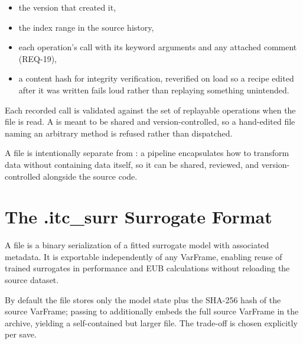 \begin{itemize}[noitemsep,topsep=2pt]
  \item the \itc{} version that created it,
  \item the index range in the source history,
  \item each operation's call with its keyword arguments and any
    attached comment (REQ-19),
  \item a content hash for integrity verification, reverified on load so
    a recipe edited after it was written fails loud rather than
    replaying something unintended.
\end{itemize}

Each recorded call is validated against the set of replayable operations
when the file is read. A  is meant to be shared and
version-controlled, so a hand-edited file naming an arbitrary method is
refused rather than dispatched.

A  file is intentionally separate from : a
pipeline encapsulates how to transform data without containing data itself,
so it can be shared, reviewed, and version-controlled alongside the source
code.

\section{The .itc\_surr Surrogate Format}

A  file is a binary serialization of a fitted surrogate
model with associated metadata. It is exportable independently of any
VarFrame, enabling reuse of trained surrogates in performance and EUB
calculations without reloading the source dataset.

By default the file stores only the model state plus the SHA-256 hash of
the source VarFrame; passing  to
 additionally embeds the full source VarFrame in the
archive, yielding a self-contained but larger file. The trade-off is
chosen explicitly per save.
